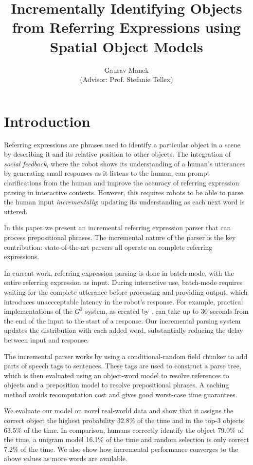 \documentclass[conference]{IEEEtran}
\title{Incrementally Identifying Objects from Referring Expressions using Spatial Object Models}
\author{Gaurav Manek\\(Advisor: Prof. Stefanie Tellex)}
\numberwithin{equation}{section}
\begin{document}
\maketitle


\section{Introduction}

Referring expressions are phrases used to identify a particular object in a scene by describing it and its relative position to other objects. The integration of \emph{social feedback}, where the robot shows its understanding of a human's utterances by generating small responses as it listens to the human, can prompt clarifications from the human and improve the accuracy of referring expression parsing in interactive contexts. However, this requires robots to be able to parse the human input \emph{incrementally}: updating its understanding as each next word is uttered. 

In this paper we present an incremental referring expression parser that can process prepositional phrases. The incremental nature of the parser is the key contribution: state-of-the-art parsers all operate on complete referring expressions. 

In current work, referring expression parsing is done in batch-mode, with the entire referring expression as input. \citep{tellex2011understanding,UW_RSE_ICML2012,artzi2013weakly,fang2015embodied} During interactive use, batch-mode requires waiting for the complete utterance before processing and providing output, which introduces unaccceptable latency in the robot's response. For example, practical implementations of the $G^3$ system, as created by \citet{tellex2011understanding}, can take up to 30 seconds from the end of the input to the start of a response. Our incremental parsing system updates the distribution with each added word, substantially reducing the delay between input and response.

The incremental parser works by using a conditional-random field chunker to add parts of speech tags to sentences. These tags are used to construct a parse tree, which is then evaluated using an object-word model to resolve references to objects and a preposition model to resolve prepositional phrases. A caching method avoids recomputation cost and gives good worst-case time guarantees.

We evaluate our model on novel real-world data and show that it assigns the correct object the highest probability 32.8\% of the time and in the top-3 objects 63.5\% of the time. In comparison, humans correctly identify the object 79.0\% of the time, a unigram model 16.1\% of the time and random selection is only correct 7.2\% of the time. We also show how incremental performance converges to the above values as more words are available.
\end{document}
